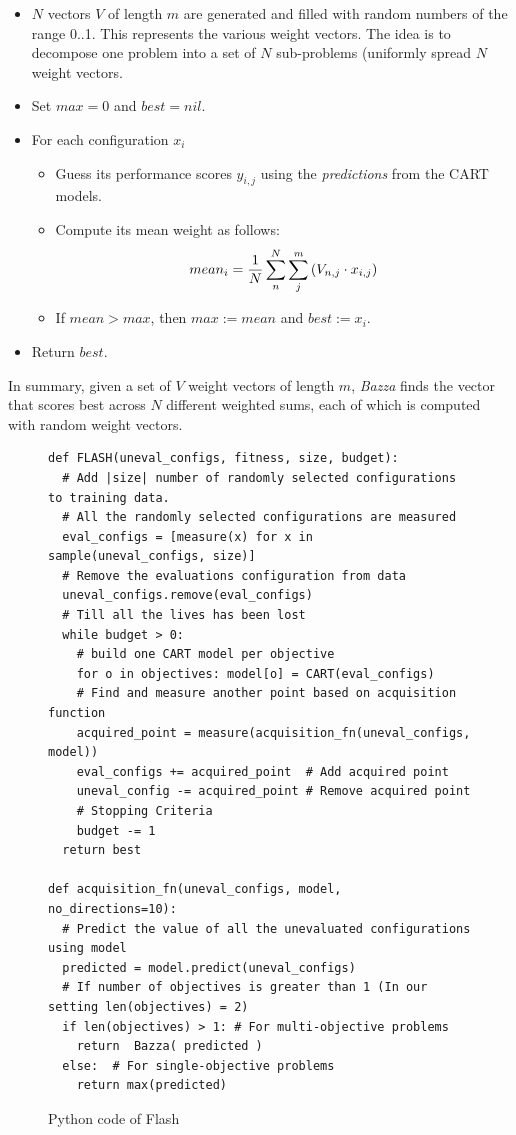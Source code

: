 \documentclass[10pt,journal,compsoc]{IEEEtran}
\newcommand{\bi}{\begin{itemize}}
\newcommand{\ei}{\end{itemize}}
\newcommand{\flash}{{\sc Flash}\xspace}
\begin{document}
\bi[leftmargin=*]
 \item
$N$ vectors $V$ of length $m$ are generated and filled with random numbers of the range 0..1. This represents the various weight vectors.  The idea is to decompose one problem into a set of $N$ sub-problems (uniformly spread $N$ weight vectors.
\item Set $\mathit{max=0}$ and $\mathit{best=nil}$.
  \item For each configuration $x_i$
 \bi
 \item
 Guess its performance scores $y_{i,j}$ using the {\em predictions} from the CART models.
\item
Compute its mean weight as follows: 
\begin{equation}\label{eq:mm}
 \centering
 mean_i=\frac{1}{N}\sum_n^N \sum_j^{{\mathit m}}\left(V_{n,j} \cdot x_{i,j}\right)
 \end{equation}
 \item
 If $\mathit{mean} > \mathit{max}$, then  $\mathit{max:=mean}$ and $\mathit{best}:=x_i$.
 \ei
\item
Return $\mathit{best}$.
\ei

In summary, given a set of $V$ weight vectors of length $m$,  {\em Bazza}  finds
the vector that scores best across  $N$ different weighted sums, each of which is computed with random weight vectors.


\begin{figure}
\small
\hspace{0.2cm}\begin{lstlisting}[xrightmargin=5.0ex,mathescape,frame=none,numbers=right]
def FLASH(uneval_configs, fitness, size, budget):
  # Add |size| number of randomly selected configurations to training data. 
  # All the randomly selected configurations are measured
  eval_configs = [measure(x) for x in sample(uneval_configs, size)]
  # Remove the evaluations configuration from data
  uneval_configs.remove(eval_configs)
  # Till all the lives has been lost
  while budget > 0:
    # build one CART model per objective
    for o in objectives: model[o] = CART(eval_configs)
    # Find and measure another point based on acquisition function
    acquired_point = measure(acquisition_fn(uneval_configs, model))
    eval_configs += acquired_point  # Add acquired point 
    uneval_config -= acquired_point # Remove acquired point 
    # Stopping Criteria
    budget -= 1
  return best
  
def acquisition_fn(uneval_configs, model, no_directions=10):  
  # Predict the value of all the unevaluated configurations using model
  predicted = model.predict(uneval_configs)
  # If number of objectives is greater than 1 (In our setting len(objectives) = 2)
  if len(objectives) > 1: # For multi-objective problems
    return  Bazza( predicted )
  else:  # For single-objective problems
    return max(predicted)  
\end{lstlisting}
\caption{Python code of \flash}
\label{fig:flash_frame}  
\end{figure}
\end{document}
